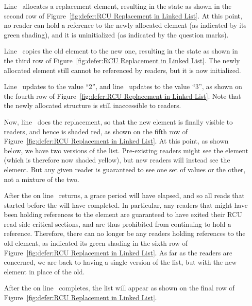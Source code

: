 \begin{fcvref}
Line~ allocates a replacement element,
resulting in the state as shown in the second row of
Figure~\ref{fig:defer:RCU Replacement in Linked List}.
At this point, no reader can hold a reference to the newly allocated
element (as indicated by its green shading), and it is uninitialized
(as indicated by the question marks).

Line~ copies the old element to the new one, resulting in the
state as shown in the third row of
Figure~\ref{fig:defer:RCU Replacement in Linked List}.
The newly allocated element still cannot be referenced by readers, but
it is now initialized.

Line~ updates  to the value ``2'', and
line~ updates  to the value ``3'',
as shown on the fourth row of
Figure~\ref{fig:defer:RCU Replacement in Linked List}.
Note that the newly allocated structure is still inaccessible to readers.

Now, line~ does the replacement, so that the new element is
finally visible to readers, and hence is shaded red, as shown on
the fifth row of
Figure~\ref{fig:defer:RCU Replacement in Linked List}.
At this point, as shown below, we have two versions of the list.
Pre-existing readers might see the  element (which is
therefore now shaded yellow), but
new readers will instead see the  element.
But any given reader is guaranteed to see one set of values or the
other, not a mixture of the two.

After the  on line~ returns,
a grace period will have elapsed, and so all reads that started before the
 will have completed.
In particular, any readers that might have been holding references
to the  element are guaranteed to have exited
their RCU read-side critical sections, and are thus prohibited from
continuing to hold a reference.
Therefore, there can no longer be any readers holding references
to the old element, as indicated its green shading in the sixth row of
Figure~\ref{fig:defer:RCU Replacement in Linked List}.
As far as the readers are concerned, we are back to having a single version
of the list, but with the new element in place of the old.

After the  on line~ completes, the list will
appear as shown on the final row of
Figure~\ref{fig:defer:RCU Replacement in Linked List}.
\end{fcvref}


